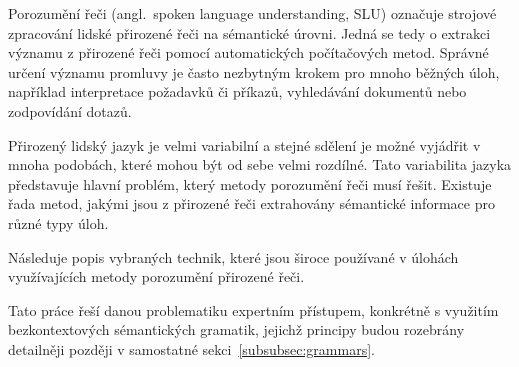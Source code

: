 Porozumění řeči (angl.~spoken language understanding, SLU) označuje strojové zpracování lidské přirozené řeči na sémantické úrovni.
Jedná se tedy o extrakci významu z přirozené řeči pomocí automatických počítačových metod.
Správné určení významu promluvy je často nezbytným krokem pro mnoho běžných úloh, například interpretace požadavků či příkazů,
vyhledávání dokumentů nebo zodpovídání dotazů.~\cite{the_conversational_interface}

Přirozený lidský jazyk je velmi variabilní a stejné sdělení je možné vyjádřit v mnoha podobách, které mohou být od sebe velmi rozdílné.
Tato variabilita jazyka představuje hlavní problém, který metody porozumění řeči musí řešit.
Existuje řada metod, jakými jsou z přirozené řeči extrahovány sémantické informace pro různé typy úloh.

Následuje popis vybraných technik, které jsou široce používané v úlohách využívajících
metody porozumění přirozené řeči.~\cite{the_conversational_interface}

Tato práce řeší danou problematiku expertním přístupem, konkrétně s využitím bezkontextových sémantických gramatik,
jejichž principy budou rozebrány detailněji později v samostatné sekci~\ref{subsubsec:grammars}.

